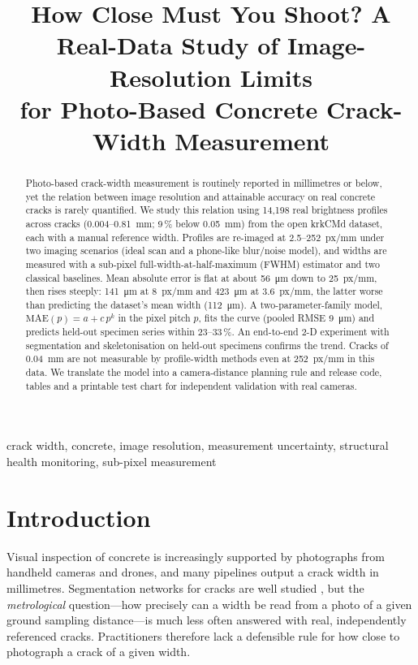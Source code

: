 \documentclass[conference]{IEEEtran}
\begin{document}
\title{How Close Must You Shoot? A Real-Data Study of Image-Resolution Limits \\ for Photo-Based Concrete Crack-Width Measurement}

\author{}

\maketitle

\begin{abstract}
Photo-based crack-width measurement is routinely reported in millimetres or below, yet the relation between image
resolution and attainable accuracy on real concrete cracks is rarely quantified. We study this relation using
14{,}198 real brightness profiles across cracks (0.004--0.81~mm; 9\,\% below 0.05~mm) from the open krkCMd dataset, each with a manual
reference width. Profiles are re-imaged at 2.5--252~px/mm under two imaging scenarios (ideal scan and a
phone-like blur/noise model), and widths are measured with a sub-pixel full-width-at-half-maximum (FWHM)
estimator and two classical baselines. Mean absolute error is flat at about \SI{56}{\micro\metre} down to
25~px/mm, then rises steeply: \SI{141}{\micro\metre} at 8~px/mm and \SI{423}{\micro\metre} at 3.6~px/mm, the
latter worse than predicting the dataset's mean width (\SI{112}{\micro\metre}). A two-parameter-family model,
$\mathrm{MAE}(p)=a+c\,p^{k}$ in the pixel pitch $p$, fits the curve (pooled RMSE \SI{9}{\micro\metre}) and
predicts held-out specimen series within 23--33\,\%. An end-to-end 2-D experiment with segmentation and
skeletonisation on held-out specimens confirms the trend. Cracks of 0.04~mm are not measurable by profile-width methods even at
252~px/mm in this data. We translate the model into a camera-distance planning rule and release code,
tables and a printable test chart for independent validation with real cameras.
\end{abstract}

\begin{IEEEkeywords}
crack width, concrete, image resolution, measurement uncertainty, structural health monitoring, sub-pixel measurement
\end{IEEEkeywords}

\section{Introduction}
Visual inspection of concrete is increasingly supported by photographs from handheld cameras and drones, and many
pipelines output a crack width in millimetres. Segmentation networks for cracks are well studied
\cite{liu2019deepcrack,ronneberger2015unet,dorafshan2018sdnet,ozgenel2018isarc}, but the \emph{metrological} question---how
precisely can a width be read from a photo of a given ground sampling distance---is much less often answered with
real, independently referenced cracks. Practitioners therefore lack a defensible rule for how close to
photograph a crack of a given width.
\end{document}
